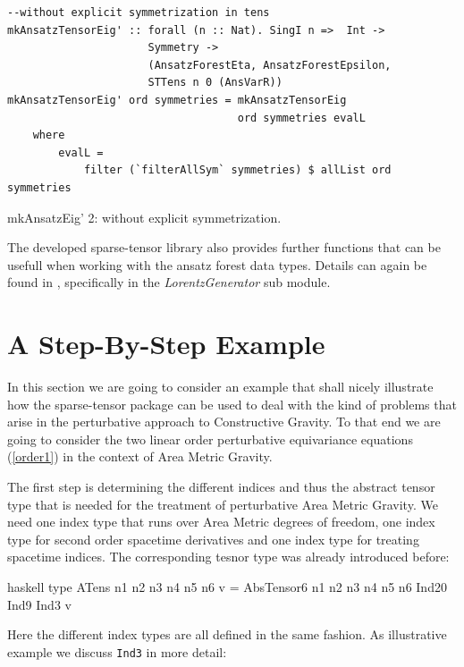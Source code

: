 \documentclass[a4paper,12pt, DIV=14, BCOR=5mm, twoside, headsepline, numbers=noenddot]{scrbook}
\begin{document}
\begin{listing}[hbt!]
\begin{verbatim}
--without explicit symmetrization in tens
mkAnsatzTensorEig' :: forall (n :: Nat). SingI n =>  Int ->
                      Symmetry ->
                      (AnsatzForestEta, AnsatzForestEpsilon,
                      STTens n 0 (AnsVarR))
mkAnsatzTensorEig' ord symmetries = mkAnsatzTensorEig
                                    ord symmetries evalL
    where
        evalL =
            filter (`filterAllSym` symmetries) $ allList ord symmetries
\end{verbatim} 
\caption{mkAnsatzEig' 2: without explicit symmetrization.}\label{mkAnsatzEig2'}
\end{listing}

The developed sparse-tensor library also provides further functions that can be usefull when working with the ansatz forest data types. Details can again be found in \cite{sparse-tensor}, specifically in the \textit{LorentzGenerator} sub module.

\section{A Step-By-Step Example}
In this section we are going to consider an example that shall nicely illustrate how the sparse-tensor package can be used to deal with the kind of problems that arise in the perturbative approach to Constructive Gravity. To that end we are going to consider the two linear order perturbative equivariance equations (\ref{order1}) in the context of Area Metric Gravity. 

The first step is determining the different indices and thus the abstract tensor type that is needed for the treatment of perturbative Area Metric Gravity. 
We need one index type that runs over Area Metric degrees of freedom, one index type for second order spacetime derivatives and one index type for treating spacetime indices. The corresponding tesnor type was already introduced before:

\begin{center}
\begin{cminted}{haskell}
type ATens n1 n2 n3 n4 n5 n6 v = 
     AbsTensor6 n1 n2 n3 n4 n5 n6 Ind20 Ind9 Ind3 v
\end{cminted}
\end{center}

Here the different index types are all defined in the same fashion. As illustrative example we discuss \texttt{Ind3} in more detail:
\end{document}
